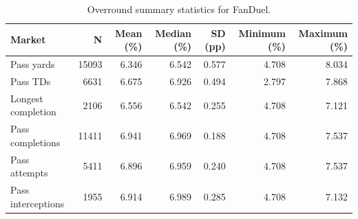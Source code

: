 \begin{table}
\caption{Overround summary statistics for FanDuel.}
\label{tab:overround_fanduel}
\begin{tabular}{lrrrrrr}
\toprule
Market & N & Mean (\%) & Median (\%) & SD (pp) & Minimum (\%) & Maximum (\%) \\
\midrule
Pass yards & 15093 & 6.346 & 6.542 & 0.577 & 4.708 & 8.034 \\
Pass TDs & 6631 & 6.675 & 6.926 & 0.494 & 2.797 & 7.868 \\
Longest completion & 2106 & 6.556 & 6.542 & 0.255 & 4.708 & 7.121 \\
Pass completions & 11411 & 6.941 & 6.969 & 0.188 & 4.708 & 7.537 \\
Pass attempts & 5411 & 6.896 & 6.959 & 0.240 & 4.708 & 7.537 \\
Pass interceptions & 1955 & 6.914 & 6.989 & 0.285 & 4.708 & 7.132 \\
\bottomrule
\end{tabular}
\end{table}
